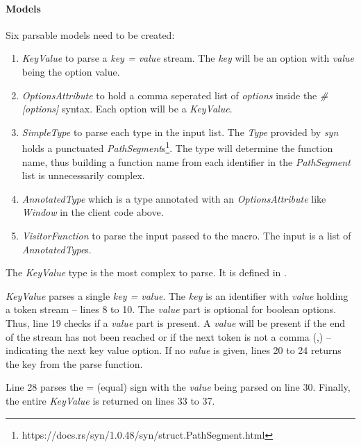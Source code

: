 \paragraph{Models}
Six parsable models need to be created:
\begin{enumerate}
	\item \textit{KeyValue} to parse a \textit{key = value} stream.
	      The \textit{key} will be an option with \textit{value} being the option value.
	\item \textit{OptionsAttribute} to hold a comma seperated list of \textit{options} inside the \textit{\#[options]} syntax.
	      Each option will be a \textit{KeyValue}.
	\item \textit{SimpleType} to parse each type in the input list.
	      The \textit{Type} provided by \textit{syn} holds a punctuated \textit{PathSegment}s\footnote{https://docs.rs/syn/1.0.48/syn/struct.PathSegment.html}.
	      The type will determine the function name, thus building a function name from each identifier in the \textit{PathSegment} list is unnecessarily complex.
	\item \textit{AnnotatedType} which is a type annotated with an \textit{OptionsAttribute} like \textit{Window} in the client code above.
	\item \textit{VisitorFunction} to parse the input passed to the macro.
	      The input is a list of \textit{AnnotatedType}s.
\end{enumerate}

The \textit{KeyValue} type is the most complex to parse.
It is defined in .


\textit{KeyValue} parses a single \textit{key = value}.
The \textit{key} is an identifier with \textit{value} holding a token stream -- lines 8 to 10.
The \textit{value} part is optional for boolean options.
Thus, line 19 checks if a \textit{value} part is present.
A \textit{value} will be present if the end of the stream has not been reached or if the next token is not a comma (,) -- indicating the next key value option.
If no \textit{value} is given, lines 20 to 24 returns the key from the parse function.

Line 28 parses the = (equal) sign with the \textit{value} being parsed on line 30.
Finally, the entire \textit{KeyValue} is returned on lines 33 to 37.

